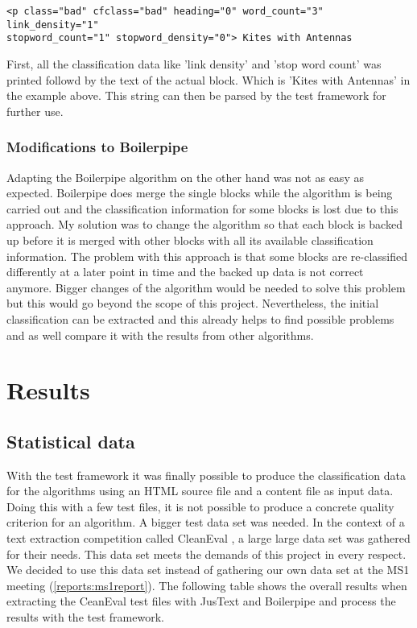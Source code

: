 \begin{lstlisting}
<p class="bad" cfclass="bad" heading="0" word_count="3" link_density="1" 
stopword_count="1" stopword_density="0"> Kites with Antennas
\end{lstlisting}

First, all the classification data like 'link density' and 'stop word count' was printed followd by the text of the actual block. Which is 'Kites with Antennas' in the example above. This string can then be parsed by the test framework for further use.


\subsubsection{Modifications to Boilerpipe}

Adapting the Boilerpipe algorithm on the other hand was not as easy as expected. Boilerpipe does merge the single blocks while the algorithm is being carried out and the classification information for some blocks is lost due to this approach. My solution was to change the algorithm so that each block is backed up before it is merged with other blocks with all its available classification information. The problem with this approach is that some blocks are re-classified differently at a later point in time and the backed up data is not correct anymore. Bigger changes of the algorithm would be needed to solve this problem but this would go beyond the scope of this project. Nevertheless, the initial classification can be extracted and this already helps to find possible problems and as well compare it with the results from other algorithms.


\section{Results}


\subsection{Statistical data}

With the test framework it was finally possible to produce the classification data for the  algorithms using an HTML source file and a content file as input data. Doing this with a few test files, it is not possible to produce a concrete quality criterion for an algorithm. A bigger test data set was needed. In the context of a text extraction competition called CleanEval \cite{CleanEval:online}, a large large data set was gathered for their needs. This data set meets the demands of this project in every respect. We decided to use this data set instead of gathering our own data set at the MS1 meeting (\ref{reports:ms1report}). 
The following table shows the overall results when extracting the CeanEval test files with JusText and Boilerpipe and process the results with the test framework.


